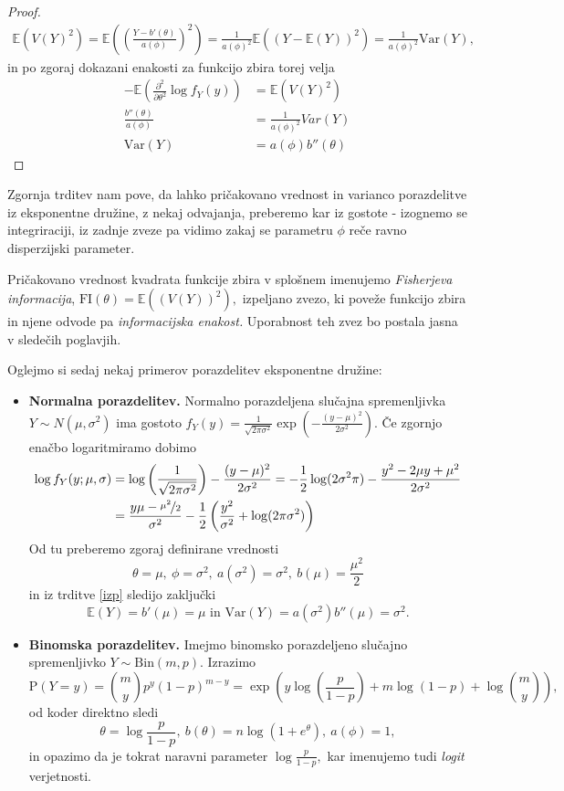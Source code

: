 \documentclass[12pt,a4paper]{amsart}
\theoremstyle{definition} %
\theoremstyle{plain} %
\begin{document}
\begin{proof}
\begin{gather*}
    \mathbb{E}\left(V(Y)^2\right) = \mathbb{E}\left(\left(\frac{Y-b'(\theta)}{a(\phi) }\right)^2\right) = \frac{1}{a(\phi)^2}\mathbb{E}((Y - \mathbb{E}(Y))^2) = \frac{1}{a(\phi)^2}\mathrm{Var}(Y),
\end{gather*}
in po zgoraj dokazani enakosti za funkcijo zbira torej velja
\begin{align*}
    -\mathbb{E}\left(\frac{\partial^2}{\partial\theta^2}\log f_{Y}(y)\right) &= \mathbb{E}\left(V(Y)^2\right) \\
    \frac{b''(\theta)}{a(\phi)} &= \frac{1}{a(\phi)^2}Var(Y) \\
    \mathrm{Var}(Y) &= a(\phi)b''(\theta)
\end{align*}
\end{proof}
Zgornja trditev nam pove, da lahko pričakovano vrednost in varianco porazdelitve iz eksponentne družine, z nekaj odvajanja, preberemo kar iz gostote - izognemo se integriraciji, iz zadnje
zveze pa vidimo zakaj se parametru $\phi$ reče ravno disperzijski parameter.

Pričakovano vrednost kvadrata funkcije zbira v splošnem imenujemo \textit{Fisherjeva informacija}, $\mathrm{FI}(\theta) = \mathbb{E}((V(Y))^2),$ izpeljano zvezo, ki poveže funkcijo zbira in njene odvode pa \textit{informacijska enakost.}
Uporabnost teh zvez bo postala jasna v sledečih poglavjih.

Oglejmo si sedaj nekaj primerov porazdelitev eksponentne družine:
\begin{itemize}
    \item \textbf{Normalna porazdelitev.} Normalno porazdeljena slučajna spremenljivka $Y \sim N(\mu, \sigma^2)$
    ima gostoto $f_{Y}(y) = \frac{1}{\sqrt{2\pi\sigma^2}}\exp{\left(-\frac{(y-\mu)^2}{2\sigma^2}\right)}.$
    Če zgornjo enačbo logaritmiramo dobimo
    \begin{align*}
        \log f_{Y}(y;\mu, \sigma) &= \log\left(\frac{1}{\sqrt{2\pi\sigma^2}}\right) -\frac{(y-\mu)^2}{2\sigma^2} = -\frac{1}{2}\log(2\sigma^2\pi) - \frac{y^2 - 2\mu y + \mu^2}{2 \sigma^2}    \\ \nonumber
                            &= \frac{y\mu-\nicefrac{\mu^2}{2}}{\sigma^2} - \frac{1}{2}\left(\frac{y^2}{\sigma^2} + \log(2\pi\sigma^2)\right) 
    \end{align*}
    Od tu preberemo zgoraj definirane vrednosti
    \[
        \theta = \mu,~\phi = \sigma^2,~a(\sigma^2)=\sigma^2,~b(\mu) = \frac{\mu^2}{2}
    \]
    in iz trditve \ref{izp} sledijo zaključki
    \[
        \mathbb{E}(Y) = b'(\mu) = \mu \text{ in } \mathrm{Var}(Y) = a(\sigma^2)b''(\mu) = \sigma^2.
    \]

    \item \textbf{Binomska porazdelitev.} Imejmo binomsko porazdeljeno slučajno spremenljivko $Y \sim \mathrm{Bin}(m,p).$ Izrazimo 
    \[
        \mathrm{P}(Y = y) = \binom{m}{y}p^y(1-p)^{m-y} = \exp\left(y\log\left(\frac{p}{1-p}\right) + m\log(1-p) + \log{\binom{m}{y}}\right),
    \]
    od koder direktno sledi
    \[
        \theta = \log\frac{p}{1-p},~b(\theta) = n\log(1 + e^{\theta}),~a(\phi) = 1,
    \]
    in opazimo da je tokrat naravni parameter $\log\frac{p}{1-p},$ kar imenujemo tudi \textit{logit} verjetnosti.
\end{itemize}
\end{document}
